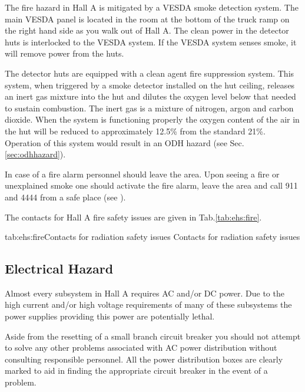  The fire hazard in Hall A is mitigated by a VESDA smoke detection system. 
 The main VESDA panel is located in the room at the bottom of the truck ramp on the 
 right hand side as you walk out of Hall A. The clean power in the detector huts is 
 interlocked to the VESDA system. If the VESDA system senses smoke, it will remove power 
 from the huts.

 The detector huts are equipped with a clean agent fire suppression system. This system, when triggered 
 by a smoke detector installed on the hut ceiling, releases an inert gas mixture into the hut and dilutes 
 the oxygen level below that needed to sustain combustion. The inert gas is a mixture of nitrogen, 
 argon and carbon dioxide. When the system is functioning properly the oxygen content of the air in the 
 hut will be reduced to approximately 12.5\% from the standard 21\%. Operation of this system
 would result in an ODH hazard (see Sec.\ref{sec:odhhazard}).

 In case of a fire alarm personnel should leave the area. Upon seeing a fire
 or unexplained smoke one should activate the fire alarm, leave the area and
 call 911 and 4444 from a safe place (see \cite{EHScebaf}).
  
 The contacts for Hall A fire safety issues are given in Tab.\ref{tab:ehs:fire}.
 
 \begin{namestab}{tab:ehs:fire}{Contacts for radiation safety issues}{%
   Contacts for radiation safety issues}
 \end{namestab}

\begin{safetyen}{0}{0}
\section{Electrical Hazard} 
\label{sec:electrhazard}
\end{safetyen}

 Almost every subsystem in Hall A requires AC and/or DC power. Due to the high current
 and/or high voltage requirements of many of these subsystems the power supplies providing this 
 power are potentially lethal.

 Aside from the resetting of a small branch circuit breaker you should not attempt to solve
 any other problems associated with AC power distribution without consulting responsible personnel. All
 the power distribution boxes are clearly marked to aid in finding the appropriate circuit breaker in
 the event of a problem.

